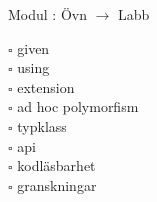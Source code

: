 
    Modul : Övn  $\rightarrow$ Labb 
    \begin{multicols}{3}\SlideFontTiny
    $\square$ given \\
$\square$ using \\
$\square$ extension \\
$\square$ ad hoc polymorfism \\
$\square$ typklass \\
$\square$ api \\
$\square$ kodläsbarhet \\
$\square$ granskningar \\
    \end{multicols}
    